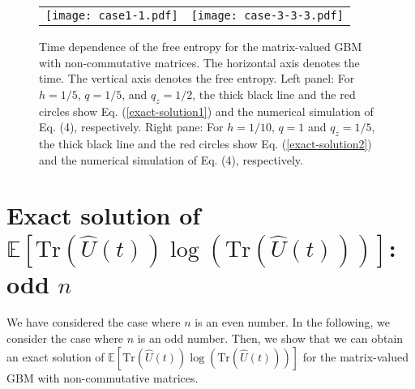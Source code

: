 \documentclass[
aps,
pre,
showpacs
]{revtex4-1}
\newcommand{\Tr}{\mbox{Tr} }
\begin{document}
\begin{figure}[H]
\begin{tabular}{cc}
\begin{minipage}[t]{0.45\hsize}
\centering
\texttt{[image: case1-1.pdf]}
\end{minipage} &
\begin{minipage}[t]{0.45\hsize}
\centering
\texttt{[image: case-3-3-3.pdf]}
\end{minipage}
\end{tabular}
\caption{Time dependence of the free entropy for the matrix-valued GBM with non-commutative matrices. 
The horizontal axis denotes the time. The vertical axis denotes the free entropy.
Left panel: For $h=1/5$, $q=1/5$, and $q_z=1/2$, the thick black line and the red circles show Eq. (\ref{exact-solution1}) and the numerical simulation of Eq. (4), respectively.
Right pane: For $h=1/10$, $q=1$ and $q_z=1/5$, the thick black line and the red circles show Eq. (\ref{exact-solution2}) and the numerical simulation of Eq. (4), respectively.}
\label{fig1}
\end{figure}


\section{Exact solution of $\mathbb{E} \left[ \Tr \left(\hat{U}(t)\right)\log\left( \Tr \left(\hat{U}(t)\right) \right) \right]$: odd $n$} \label{n-odd}
We have considered the case where $n$ is an even number.
In the following, we consider the case where $n$ is an odd number.
Then, we show that we can obtain an exact solution of $\mathbb{E} \left[ \Tr \left(\hat{U}(t)\right)\log\left( \Tr \left(\hat{U}(t)\right) \right) \right]$ for the matrix-valued GBM with non-commutative matrices.
\end{document}
